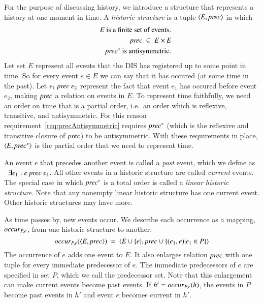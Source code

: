 \documentclass{elsarticle}
\def\id#1{\text{\em #1\/}}
\def\Events{{\mathit E}}
\begin{document}
	For the purpose of discussing history, we introduce a structure that represents a history at one moment in time.
	A {\em historic structure} is a tuple $\la \Events, \id{prec}\ra$ in which
	\begin{eqnarray}
		&&\Events\text{ is a finite set of events.}\\
		&&\id{prec}\ \subseteq\ \Events\times\Events\label{req:precInE}\\
		&&\id{prec}^*\text{ is antisymmetric.}\label{req:precAntisymmetric}
	\end{eqnarray}
	Let set $\Events$ represent all events that the DIS has registered up to some point in time.
	So for every event $e\in\Events$ we can say that it has occured (at some time in the past).
	Let $e_1\ \id{prec}\ e_2$ represent the fact that event $e_1$ has occured before event $e_2$,
	making $\id{prec}$ a relation on events in $\Events$.
	To represent time faithfully, we need an order on time that is a partial order,
	i.e.\ an order which is reflexive, transitive, and antisymmetric.
	For this reason requirement~\ref{req:precAntisymmetric} requires $\id{prec}^*$
	(which is the reflexive and transitive closure of $\id{prec}$)
	to be antisymmetric.
	With these requirements in place,  $\la\Events,\id{prec}^*\ra$ is the partial order that we need to represent time.

	An event $e$ that precedes another event is called a {\em past} event,
	which we define as \ $\exists e_1: e\ \id{prec}\ e_1$.
	All other events in a historic structure are called {\em current} events.
	The special case in which $\id{prec}^*$ is a total order is called a {\em linear historic structure}.
	Note that any nonempty linear historic structure has one current event.
	Other historic structures may have more.

	As time passes by, new events occur.
	We describe each occurrence as a mapping, $\id{occur}_{P,e}$, from one historic structure to another:
\begin{equation}
	\id{occur}_{P,e}(\la \Events, \id{prec}\ra)\ =\ \la \Events\cup\{e\}, \id{prec}\cup\{(e_1,e) | e_1\in P\}\ra
\label{req:def occur}
\end{equation}
	The occurrence of $e$ adds one event to $\Events$.
	It also enlarges relation $\id{prec}$ with one tuple for every immediate predecessor of $e$.
	The immediate predecessors of $e$ are specified in set $P$, which we call the predecessor set.
	Note that this enlargement can make current events become past events.
	If $h'=\id{occur}_{P,e}(h)$, the events in $P$ become past events in $h'$ and event $e$ becomes current in $h'$.
\end{document}
